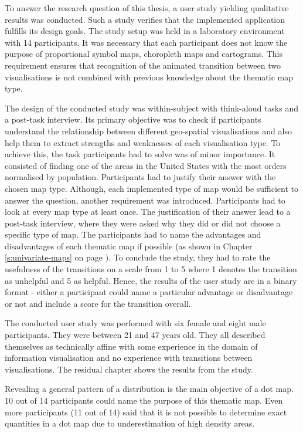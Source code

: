 To answer the research question of this thesis, a user study yielding qualitative results was conducted. Such a study verifies that the implemented application fulfills its design goals.
The study setup was held in a laboratory environment with 14 participants. It was necessary that each participant does not know the purpose of proportional symbol maps, choropleth maps and cartograms. This requirement ensures that recognition of the animated transition between two visualisations is not combined with previous knowledge about the thematic map type.

The design of the conducted study was within-subject with think-aloud tasks and a post-task interview. Its primary objective was to check if participants understand the relationship between different geo-spatial visualisations and also help them to extract strengths and weaknesses of each visualisation type. To achieve this, the task participants had to solve was of minor importance. It consisted of finding one of the areas in the United States with the most orders normalised by population. Participants had to justify their answer with the chosen map type. Although, each implemented type of map would be sufficient to answer the question, another requirement was introduced. Participants had to look at every map type at least once. The justification of their answer lead to a post-task interview, where they were asked why they did or did not choose a specific type of map. The participants had to name the advantages and disadvantages of each thematic map if possible (as shown in Chapter \ref{s:univariate-maps} on page \pageref{s:univariate-maps}).
To conclude the study, they had to rate the usefulness of the transitions on a scale from 1 to 5 where 1 denotes the transition as unhelpful and 5 as helpful. Hence, the results of the user study are in a binary format - either a participant could name a particular advantage or disadvantage or not and include a score for the transition overall.

The conducted user study was performed with six female and eight male participants. They were between 21 and 47 years old. They all described themselves as technically affine with some experience in the domain of information visualisation and no experience with transitions between visualisations. The residual chapter shows the results from the study.

Revealing a general pattern of a distribution is the main objective of a dot map. 10 out of 14 participants could name the purpose of this thematic map. Even more participants (11 out of 14) said that it is not possible to determine exact quantities in a dot map due to underestimation of high density areas.

